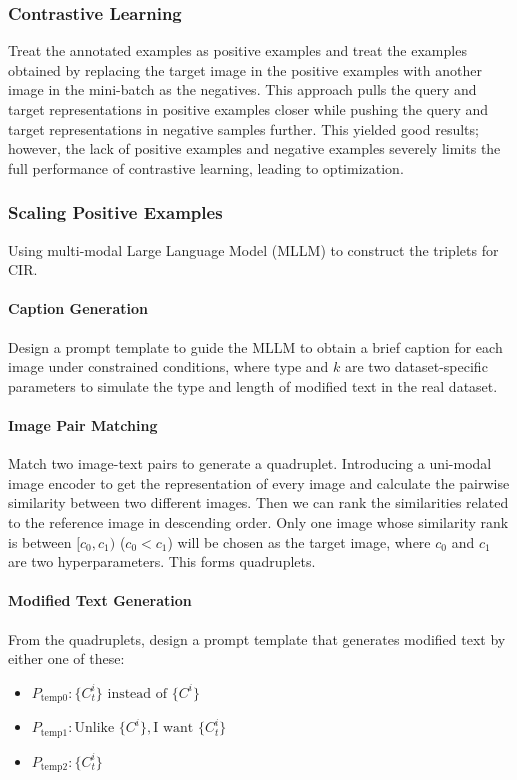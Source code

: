 \subsubsection{Contrastive Learning}
Treat the annotated examples as positive examples and treat the examples obtained by replacing the target image in the positive examples with another image in the mini-batch as the negatives. This approach pulls the query and target representations in positive examples closer while pushing the query and target representations in negative samples further. This yielded good results; however, the lack of positive examples and negative examples severely limits the full performance of contrastive learning, leading to optimization.

\subsubsection{Scaling Positive Examples}
Using multi-modal Large Language Model (MLLM) to construct the triplets for CIR.

\paragraph{Caption Generation}
Design a prompt template to guide the MLLM to obtain a brief caption for each image under constrained conditions, where \(\text{type}\) and \(k\) are two dataset-specific parameters to simulate the type and length of modified text in the real dataset.

\paragraph{Image Pair Matching}
Match two image-text pairs to generate a quadruplet. Introducing a uni-modal image encoder to get the representation of every image and calculate the pairwise similarity between two different images. Then we can rank the similarities related to the reference image in descending order. Only one image whose similarity rank is between \([c_0, c_1)\) (\(c_0 < c_1\)) will be chosen as the target image, where \(c_0\) and \(c_1\) are two hyperparameters. This forms quadruplets.

\paragraph{Modified Text Generation}
From the quadruplets, design a prompt template that generates modified text by either one of these:
\begin{itemize}
    \item \(P_{\text{temp0}}: \{C_t^i\} \text{ instead of } \{C^i\}\)
    \item \(P_{\text{temp1}}: \text{Unlike } \{C^i\}, \text{I want } \{C_t^i\}\)
    \item \(P_{\text{temp2}}: \{C_t^i\}\)
\end{itemize}

